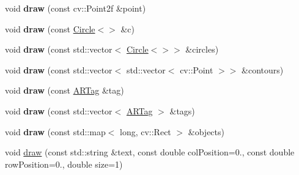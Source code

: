 \begin{DoxyCompactItemize}
\item 
\hypertarget{class_viscv_1_1_cv_image_g_u_i_a4d8d0d54dc0719bbf9246d098ec4f593}{}void {\bfseries draw} (const cv\+::\+Point2f \&point)\label{class_viscv_1_1_cv_image_g_u_i_a4d8d0d54dc0719bbf9246d098ec4f593}

\item 
\hypertarget{class_viscv_1_1_cv_image_g_u_i_ab3ee7a0c951aaa36d3f5e05b43d3a23d}{}void {\bfseries draw} (const \hyperlink{class_viscv_1_1_circle}{Circle}$<$$>$ \&c)\label{class_viscv_1_1_cv_image_g_u_i_ab3ee7a0c951aaa36d3f5e05b43d3a23d}

\item 
\hypertarget{class_viscv_1_1_cv_image_g_u_i_abc977e1456da5351fc8bc2ca0ed4c1e8}{}void {\bfseries draw} (const std\+::vector$<$ \hyperlink{class_viscv_1_1_circle}{Circle}$<$$>$$>$ \&circles)\label{class_viscv_1_1_cv_image_g_u_i_abc977e1456da5351fc8bc2ca0ed4c1e8}

\item 
\hypertarget{class_viscv_1_1_cv_image_g_u_i_a11d55a5b1a3838451b744db3aebac34d}{}void {\bfseries draw} (const std\+::vector$<$ std\+::vector$<$ cv\+::\+Point $>$$>$ \&contours)\label{class_viscv_1_1_cv_image_g_u_i_a11d55a5b1a3838451b744db3aebac34d}

\item 
\hypertarget{class_viscv_1_1_cv_image_g_u_i_af57efcd8e43090aee7e10a77c9797c20}{}void {\bfseries draw} (const \hyperlink{class_viscv_1_1_a_r_tag}{A\+R\+Tag} \&tag)\label{class_viscv_1_1_cv_image_g_u_i_af57efcd8e43090aee7e10a77c9797c20}

\item 
\hypertarget{class_viscv_1_1_cv_image_g_u_i_a188abfb4bdc75af2a09d9d1cc9abb92d}{}void {\bfseries draw} (const std\+::vector$<$ \hyperlink{class_viscv_1_1_a_r_tag}{A\+R\+Tag} $>$ \&tags)\label{class_viscv_1_1_cv_image_g_u_i_a188abfb4bdc75af2a09d9d1cc9abb92d}

\item 
\hypertarget{class_viscv_1_1_cv_image_g_u_i_a819ad5554e3d1e8d908c4511aff60d36}{}void {\bfseries draw} (const std\+::map$<$ long, cv\+::\+Rect $>$ \&objects)\label{class_viscv_1_1_cv_image_g_u_i_a819ad5554e3d1e8d908c4511aff60d36}

\item 
\hypertarget{class_viscv_1_1_cv_image_g_u_i_a2032a58da0bc543d0fc6945973108674}{}void \hyperlink{class_viscv_1_1_cv_image_g_u_i_a2032a58da0bc543d0fc6945973108674}{draw} (const std\+::string \&text, const double col\+Position=0., const double row\+Position=0., double size=1)\label{class_viscv_1_1_cv_image_g_u_i_a2032a58da0bc543d0fc6945973108674}


\end{DoxyCompactItemize}
